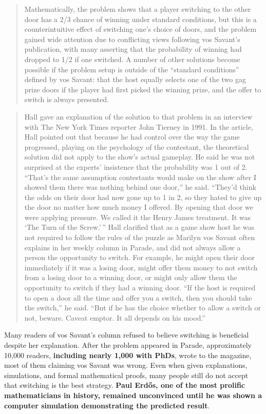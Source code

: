 \documentclass[
]{book}
\begin{document}
\begin{quote}
Mathematically, the problem shows that a player switching to the other door has a 2/3 chance of winning under standard conditions, but this is a counterintuitive effect of switching one's choice of doors, and the problem gained wide attention due to conflicting views following vos Savant's publication, with many asserting that the probability of winning had dropped to 1/2 if one switched. A number of other solutions become possible if the problem setup is outside of the ``standard conditions'' defined by vos Savant: that the host equally selects one of the two gag prize doors if the player had first picked the winning prize, and the offer to switch is always presented.
\end{quote}

\begin{quote}
Hall gave an explanation of the solution to that problem in an interview with The New York Times reporter John Tierney in 1991. In the article, Hall pointed out that because he had control over the way the game progressed, playing on the psychology of the contestant, the theoretical solution did not apply to the show's actual gameplay. He said he was not surprised at the experts' insistence that the probability was 1 out of 2. ``That's the same assumption contestants would make on the show after I showed them there was nothing behind one door,'' he said. ``They'd think the odds on their door had now gone up to 1 in 2, so they hated to give up the door no matter how much money I offered. By opening that door we were applying pressure. We called it the Henry James treatment. It was `The Turn of the Screw.'\,'' Hall clarified that as a game show host he was not required to follow the rules of the puzzle as Marilyn vos Savant often explains in her weekly column in Parade, and did not always allow a person the opportunity to switch. For example, he might open their door immediately if it was a losing door, might offer them money to not switch from a losing door to a winning door, or might only allow them the opportunity to switch if they had a winning door. ``If the host is required to open a door all the time and offer you a switch, then you should take the switch,'' he said. ``But if he has the choice whether to allow a switch or not, beware. Caveat emptor. It all depends on his mood.''
\end{quote}

Many readers of vos Savant's column refused to believe switching is beneficial despite her explanation. After the problem appeared in Parade, approximately 10,000 readers, \textbf{including nearly 1,000 with PhDs}, wrote to the magazine, most of them claiming vos Savant was wrong. Even when given explanations, simulations, and formal mathematical proofs, many people still do not accept that switching is the best strategy. \textbf{Paul Erdős, one of the most prolific mathematicians in history, remained unconvinced until he was shown a computer simulation demonstrating the predicted result}.
\end{document}
